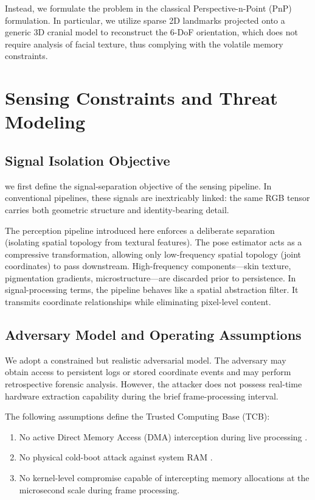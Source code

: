 \documentclass[conference]{IEEEtran}
\begin{document}
Instead, we formulate the problem in the classical Perspective-n-Point (PnP) \cite{b15, b16} formulation. In particular, we utilize sparse 2D landmarks projected onto a generic 3D cranial model to reconstruct the 6-DoF orientation, which does not require analysis of facial texture, thus complying with the volatile memory constraints.

\section{Sensing Constraints and Threat Modeling}

\subsection{Signal Isolation Objective}
we first define the signal-separation objective of the sensing pipeline. In conventional pipelines, these signals are inextricably linked: the same RGB tensor carries both geometric structure and identity-bearing detail.

The perception pipeline introduced here enforces a deliberate separation (isolating spatial topology from textural features). The pose estimator acts as a compressive transformation, allowing only low-frequency spatial topology (joint coordinates) to pass downstream. High-frequency components—skin texture, pigmentation gradients, microstructure—are discarded prior to persistence. In signal-processing terms, the pipeline behaves like a spatial abstraction filter. It transmits coordinate relationships while eliminating pixel-level content.

\subsection{Adversary Model and Operating Assumptions}
We adopt a constrained but realistic adversarial model. The adversary may obtain access to persistent logs or stored coordinate events and may perform retrospective forensic analysis. However, the attacker does not possess real-time hardware extraction capability during the brief frame-processing interval.

The following assumptions define the Trusted Computing Base (TCB):
\begin{enumerate}
    \item No active Direct Memory Access (DMA) interception during live processing \cite{b20}.
    \item No physical cold-boot attack against system RAM \cite{b19}.
    \item No kernel-level compromise capable of intercepting memory allocations at the microsecond scale during frame processing.
\end{enumerate}
\end{document}

